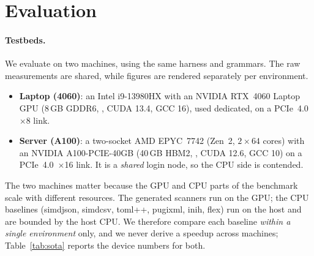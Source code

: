 \section{Evaluation}
\label{sec:eval}

\paragraph{Testbeds.}
We evaluate on two machines, using the same harness and grammars.  The raw
measurements are shared, while figures are rendered separately per
environment.
\begin{itemize}
  \item \textbf{Laptop (4060)}: an Intel i9-13980HX with an NVIDIA RTX~4060
        Laptop GPU (8\,GB GDDR6, , CUDA 13.4, GCC 16), used
        dedicated, on a PCIe~4.0~$\times$8 link.
  \item \textbf{Server (A100)}: a two-socket AMD EPYC~7742 (Zen~2,
        $2\times64$ cores) with an NVIDIA A100-PCIE-40GB (40\,GB HBM2,
        , CUDA 12.6, GCC 10) on a PCIe~4.0~$\times$16 link.
        It is a \emph{shared} login node, so the CPU side is contended.
\end{itemize}
The two machines matter because the GPU and CPU parts of the benchmark scale
with different resources.  The generated scanners run on the GPU; the CPU
baselines (\textsf{simdjson}, \textsf{simdcsv}, \textsf{toml++},
\textsf{pugixml}, \textsf{inih}, \textsf{flex}) run on the host and are bounded
by the host CPU.  We therefore compare each baseline \emph{within a single
environment} only, and we never derive a speedup across machines;
Table~\ref{tab:sota} reports the device numbers for both.


